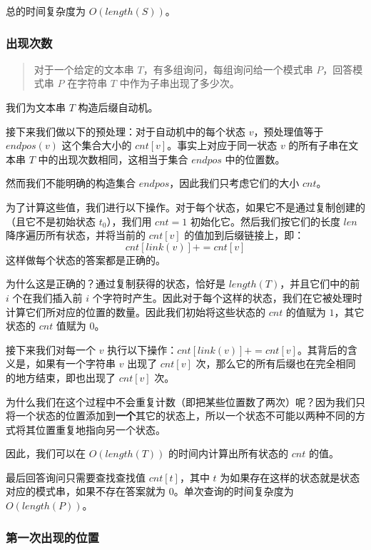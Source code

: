 总的时间复杂度为 \(O(length(S))\)。

\subsubsection{出现次数}

\begin{quote}
对于一个给定的文本串 \(T\)，有多组询问，每组询问给一个模式串
\(P\)，回答模式串 \(P\) 在字符串 \(T\) 中作为子串出现了多少次。
\end{quote}

我们为文本串 \(T\) 构造后缀自动机。

接下来我们做以下的预处理：对于自动机中的每个状态 \(v\)，预处理值等于
\(endpos(v)\) 这个集合大小的 \(cnt[v]\)。事实上对应于同一状态 \(v\)
的所有子串在文本串 \(T\) 中的出现次数相同，这相当于集合 \(endpos\)
中的位置数。

然而我们不能明确的构造集合 \(endpos\)，因此我们只考虑它们的大小
\(cnt\)。

为了计算这些值，我们进行以下操作。对于每个状态，如果它不是通过复制创建的（且它不是初始状态
\(t_0\)），我们用 \(cnt=1\) 初始化它。然后我们按它们的长度 \(len\)
降序遍历所有状态，并将当前的 \(cnt[v]\) 的值加到后缀链接上，即：
\[
cnt[link(v)]+=cnt[v]
\]
这样做每个状态的答案都是正确的。

为什么这是正确的？通过复制获得的状态，恰好是
\(length(T)\)，并且它们中的前 \(i\) 个在我们插入前 \(i\)
个字符时产生。因此对于每个这样的状态，我们在它被处理时计算它们所对应的位置的数量。因此我们初始将这些状态的
\(cnt\) 的值赋为 \(1\)，其它状态的 \(cnt\) 值赋为 \(0\)。

接下来我们对每一个 \(v\)
执行以下操作：\(cnt[link(v)]+=cnt[v]\)。其背后的含义是，如果有一个字符串
\(v\) 出现了 \(cnt[v]\)
次，那么它的所有后缀也在完全相同的地方结束，即也出现了 \(cnt[v]\) 次。

为什么我们在这个过程中不会重复计数（即把某些位置数了两次）呢？因为我们只将一个状态的位置添加到\textbf{一个}其它的状态上，所以一个状态不可能以两种不同的方式将其位置重复地指向另一个状态。

因此，我们可以在 \(O(length(T))\) 的时间内计算出所有状态的 \(cnt\)
的值。

最后回答询问只需要查找查找值 \(cnt[t]\)，其中 \(t\)
为如果存在这样的状态就是状态对应的模式串，如果不存在答案就为
\(0\)。单次查询的时间复杂度为 \(O(length(P))\)。

\subsubsection{第一次出现的位置}

